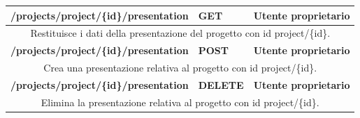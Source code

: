 \begin{table}[H]
	\begin{tabular}{|p{}|p{}|p{}|}
		\toprule
		\textbf{/projects/project/\{id\}/presentation} & \textbf{GET} & \textbf{Utente proprietario} \\ \midrule
		\multicolumn{3}{|c|}{Restituisce i dati della presentazione del progetto con id project/\{id\}.} \\
		\bottomrule
		\textbf{/projects/project/\{id\}/presentation} & \textbf{POST} & \textbf{Utente proprietario} \\ \midrule
		\multicolumn{3}{|c|}{Crea una presentazione relativa al progetto con id project/\{id\}.} \\
		\bottomrule
		\textbf{/projects/project/\{id\}/presentation} & \textbf{DELETE} & \textbf{Utente proprietario} \\ \midrule
		\multicolumn{3}{|c|}{Elimina la presentazione relativa al progetto con id project/\{id\}.} \\
		\bottomrule
	\end{tabular}\\
	\par\bigskip
	

\end{table}
